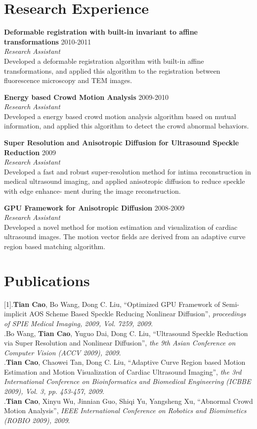 \documentclass[line,margin]{res}
\begin{document}
\begin{resume}
\section{\sc Research Experience} 
\smallskip

\textbf{Deformable registration with built-in invariant to aﬃne transformations} \hfill      2010-2011 \\
\textit{ Research Assistant}\\
Developed a deformable registration algorithm with built-in aﬃne transformations, and
applied this algorithm to the registration between ﬂuorescence microscopy and TEM images.

\textbf{Energy based Crowd Motion Analysis} \hfill      2009-2010 \\
\textit{Research Assistant}\\
Developed a energy based crowd motion analysis algorithm based on mutual information, and
applied this algorithm to detect the crowd abnormal behaviors.

\textbf{Super Resolution and Anisotropic Diﬀusion for Ultrasound Speckle Reduction} \hfill      2009 \\
\textit{Research Assistant}\\
Developed a fast and robust super-resolution method for intima reconstruction in medical
ultrasound imaging, and applied anisotropic diﬀusion to reduce speckle with edge enhance-
ment during the image reconstruction.

\textbf{GPU Framework for Anisotropic Diffusion} \hfill      2008-2009 \\
\textit{Research Assistant}\\
Developed a novel method for motion estimation and visualization of cardiac ultrasound
images. The motion vector ﬁelds are derived from an adaptive curve region based matching
algorithm.

\section{\sc Publications}  

[1].\textbf{Tian Cao}, Bo Wang, Dong C. Liu, ``Optimized GPU Framework of Semi-implicit AOS
Scheme Based Speckle Reducing Nonlinear Diﬀusion'',  \emph{proceedings of SPIE Medical Imaging, 2009, Vol. 7259, 2009}.\\
\smallskip
[2].Bo Wang, \textbf{Tian Cao}, Yuguo Dai, Dong C. Liu, ``Ultrasound Speckle Reduction via Super Resolution and Nonlinear Diffusion'',  \emph{the 9th Asian Conference on Computer Vision (ACCV 2009), 2009}. \\
\smallskip
[3].\textbf{Tian Cao}, Chaowei Tan, Dong C. Liu, ``Adaptive Curve Region based Motion Estimation and Motion Visualization of Cardiac Ultrasound Imaging'',  \emph{the 3rd International Conference on Bioinformatics and Biomedical Engineering (ICBBE 2009), Vol. 3, pp. 453-457, 2009}.\\
\smallskip
[4].\textbf{Tian Cao}, Xinyu Wu, Jinnian Guo, Shiqi Yu, Yangsheng Xu, ``Abnormal Crowd Motion Analysis'', \emph{IEEE International Conference on Robotics and Biomimetics (ROBIO 2009), 2009}.


\end{resume}
\end{document}
